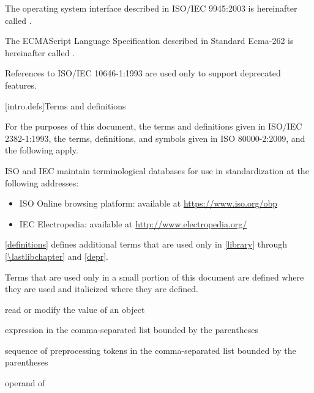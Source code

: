 \pnum
The operating system interface described in ISO/IEC 9945:2003 is
hereinafter called .

\pnum
The ECMAScript Language Specification described in Standard Ecma-262 is
hereinafter called .

\pnum
\begin{note}
References to ISO/IEC 10646-1:1993 are used only
to support deprecated features.
\end{note}

[intro.defs]{Terms and definitions}

\pnum
{}%
For the purposes of this document,
the terms and definitions
given in ISO/IEC 2382-1:1993,
the terms, definitions, and symbols
given in ISO 80000-2:2009,
and the following apply.

\pnum
ISO and IEC maintain terminological databases
for use in standardization
at the following addresses:
\begin{itemize}
\item ISO Online browsing platform: available at \url{https://www.iso.org/obp}
\item IEC Electropedia: available at \url{http://www.electropedia.org/}
\end{itemize}

\pnum
\ref{definitions}
defines additional terms that are used only in \ref{library}
through \ref{\lastlibchapter} and \ref{depr}.

\pnum
Terms that are used only in a small portion of this document
are defined where they are used and italicized where they are
defined.

%
 read or modify the value of an object

%
 expression in the
comma-separated list bounded by the parentheses

%
%
 sequence of preprocessing tokens in the
comma-separated list bounded by the parentheses

%
%
 operand of 

